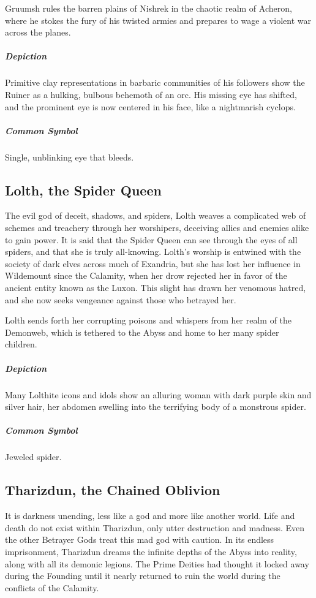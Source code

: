 \documentclass[letterpaper, twocolumn, openany, nodeprecatedcode, layout=true]{dndbook}
\begin{document}
Gruumsh rules the barren plains of Nishrek in the chaotic realm of Acheron, where he stokes
the fury of his twisted armies and prepares to wage a violent war across the planes.

\subparagraph{Depiction}
Primitive clay representations in barbaric communities of his followers show the Ruiner as a
hulking, bulbous behemoth of an orc. His missing eye has shifted, and the prominent eye is now
centered in his face, like a nightmarish cyclops.

\subparagraph{Common Symbol}
Single, unblinking eye that bleeds.

\subsection{Lolth, the Spider Queen}

The evil god of deceit, shadows, and spiders, Lolth weaves a complicated web of schemes and
treachery through her worshipers, deceiving allies and enemies alike to gain power. It is
said that the Spider Queen can see through the eyes of all spiders, and that she is truly
all-knowing. Lolth’s worship is entwined with the society of dark elves across much of
Exandria, but she has lost her influence in Wildemount since the Calamity, when her drow
rejected her in favor of the ancient entity known as the Luxon. This slight has drawn her
venomous hatred, and she now seeks vengeance against those who betrayed her.

Lolth sends forth her corrupting poisons and whispers from her realm of the Demonweb,
which is tethered to the Abyss and home to her many spider children.

\subparagraph{Depiction}
Many Lolthite icons and idols show an alluring woman with dark purple skin and silver
hair, her abdomen swelling into the terrifying body of a monstrous spider.

\subparagraph{Common Symbol}
Jeweled spider.

\subsection{Tharizdun, the Chained Oblivion}

It is darkness unending, less like a god and more like another world. Life and death do
not exist within Tharizdun, only utter destruction and madness. Even the other Betrayer
Gods treat this mad god with caution. In its endless imprisonment, Tharizdun dreams the
infinite depths of the Abyss into reality, along with all its demonic legions. The Prime
Deities had thought it locked away during the Founding until it nearly returned to ruin
the world during the conflicts of the Calamity.
\end{document}
